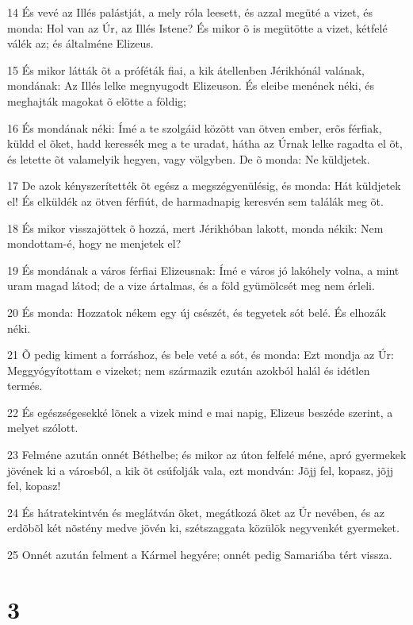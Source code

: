 \par 14 És vevé az Illés palástját, a mely róla leesett, és azzal megüté a vizet, és monda: Hol van az Úr, az Illés Istene? És mikor õ is megütötte a vizet, kétfelé válék az; és általméne Elizeus.
\par 15 És mikor látták õt a próféták fiai, a kik átellenben Jérikhónál valának, mondának: Az Illés lelke megnyugodt Elizeuson. És eleibe menének néki, és meghajták magokat õ elõtte a földig;
\par 16 És mondának néki: Ímé a te szolgáid között van ötven ember, erõs férfiak, küldd el õket, hadd keressék meg a te uradat, hátha az Úrnak lelke ragadta el õt, és letette õt valamelyik hegyen, vagy völgyben. De õ monda: Ne küldjetek.
\par 17 De azok kényszerítették õt egész a megszégyenülésig, és monda: Hát küldjetek el! És elküldék az ötven férfiút, de harmadnapig keresvén sem találák meg õt.
\par 18 És mikor visszajöttek õ hozzá, mert Jérikhóban lakott, monda nékik: Nem mondottam-é, hogy ne menjetek el?
\par 19 És mondának a város férfiai Elizeusnak: Ímé e város jó lakóhely volna, a mint uram magad látod; de a vize ártalmas, és a föld gyümölcsét meg nem érleli.
\par 20 És monda: Hozzatok nékem egy új csészét, és tegyetek sót belé. És elhozák néki.
\par 21 Õ pedig kiment a forráshoz, és bele veté a sót, és monda: Ezt mondja az Úr: Meggyógyítottam e vizeket; nem származik ezután azokból halál és idétlen termés.
\par 22 És egészségesekké lõnek a vizek mind e mai napig, Elizeus beszéde szerint, a melyet szólott.
\par 23 Felméne azután onnét Béthelbe; és mikor az úton felfelé méne, apró gyermekek jövének ki a városból, a kik õt csúfolják vala, ezt mondván: Jõjj fel, kopasz, jõjj fel, kopasz!
\par 24 És hátratekintvén és meglátván õket, megátkozá õket az Úr nevében, és az erdõbõl két nõstény medve jövén ki, szétszaggata közülök negyvenkét gyermeket.
\par 25 Onnét azután felment a Kármel hegyére; onnét pedig Samariába tért vissza.

\chapter{3}

